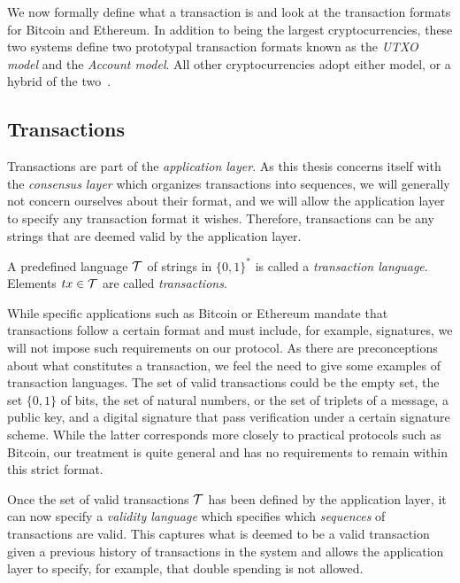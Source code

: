 We now formally define what a transaction is and look at the transaction formats
for Bitcoin and Ethereum. In addition to being the largest cryptocurrencies,
these two systems define two prototypal transaction formats known as the
\emph{UTXO model} and the \emph{Account model}. All other cryptocurrencies adopt
either model, or a hybrid of the two~\cite{chimeric}.

\subsection{Transactions}
Transactions are part of the
\emph{application layer}. As this thesis concerns
itself with the \emph{consensus layer} which organizes transactions into
sequences, we will generally not concern ourselves about their format, and we
will allow the application layer to specify any transaction format it wishes.
Therefore, transactions can be any strings that are deemed valid by the
application layer.

\begin{definition}[Transaction]
  A predefined language $\mathcal{T}$ of strings in $\{0, 1\}^*$ is called
  a \emph{transaction language}. Elements $tx \in \mathcal{T}$ are called
  \emph{transactions}.
\end{definition}

While specific applications such as Bitcoin or Ethereum mandate that
transactions follow a certain format and must include, for example, signatures,
we will not impose such requirements on our protocol. As there are
preconceptions about what constitutes a transaction, we feel the need to give
some examples of transaction languages. The set of valid transactions could be
the empty set, the set $\{0, 1\}$ of bits, the set of natural numbers, or the
set of triplets of a message, a public key, and a digital signature that pass
verification under a certain signature scheme. While the latter corresponds more
closely to practical protocols such as Bitcoin, our treatment is quite general
and has no requirements to remain within this strict format.

Once the set of valid transactions $\mathcal{T}$ has been defined by the
application layer, it can now specify a \emph{validity language} which specifies
which \emph{sequences} of transactions are valid. This captures what is deemed
to be a valid transaction given a previous history of transactions in the
system and allows the application layer to specify, for example, that double
spending is not allowed.

